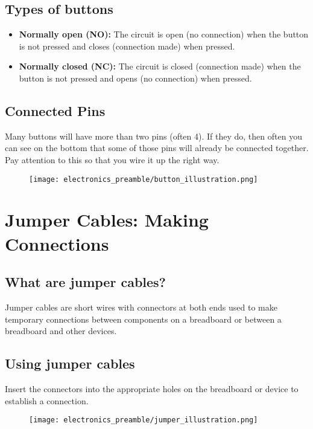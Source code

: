\subsection{Types of buttons}
\begin{itemize}
    \item \textbf{Normally open (NO):} The circuit is open (no connection) when the button is not
    pressed and closes (connection made) when pressed.
    \item \textbf{Normally closed (NC):} The circuit is closed (connection made) when the button is
    not pressed and opens (no connection) when pressed.
\end{itemize}

\subsection{Connected Pins}
Many buttons will have more than two pins (often 4). If they do, then often you can see on the bottom
that some of those pins will already be connected together. Pay attention to this so that you wire it
up the right way.

\begin{figure}[H]
\centering
    \texttt{[image: electronics\_preamble/button\_illustration.png]}
\end{figure}

\section{Jumper Cables: Making Connections}
\subsection{What are jumper cables?}
Jumper cables are short wires with connectors at both ends used to make temporary connections between
components on a breadboard or between a breadboard and other devices.

\subsection{Using jumper cables}
Insert the connectors into the appropriate holes on the breadboard or device to establish a connection.

\begin{figure}[H]
\centering
    \texttt{[image: electronics\_preamble/jumper\_illustration.png]}
\end{figure}

